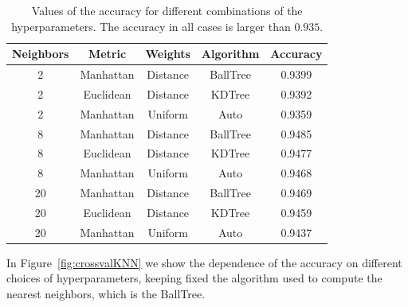 \begin{table}[h]
\begin{tabular}{c|c|c|c|c}
\hline
Neighbors   & Metric & Weights & Algorithm & \multicolumn{1}{|c}{Accuracy} \\ \hline
2                                   & Manhattan                   & Distance                    & BallTree                   &  0.9399                                  \\
2                                   & Euclidean                   & Distance                    & KDTree                   & 0.9392                           \\
2                                   & Manhattan                   & Uniform                    & Auto             &                    0.9359  \\
8                                   & Manhattan                  & Distance                   & BallTree &                    0.9485 \\
8                                   & Euclidean                 & Distance                   & KDTree             &                       0.9477 \\               
8                                   & Manhattan                   & Uniform                   & Auto              &                          0.9468 \\
20                                   & Manhattan                   & Distance                   & BallTree &                  0.9469 \\
20                                   & Euclidean                   & Distance                   & KDTree              &                       0.9459 \\               
20                                   & Manhattan                   & Uniform                   & Auto              &                          0.9437 \\
\hline
\end{tabular}
\caption{Values of the accuracy for different combinations of the hyperparameters. The accuracy in all cases is larger than $0.935$.}
\label{tab:KNN_crossval_tab}
\end{table}

In Figure~\ref{fig:crossvalKNN} we show the dependence of the accuracy on different choices of hyperparameters, keeping fixed the algorithm used to compute the nearest neighbors, which is the BallTree.

